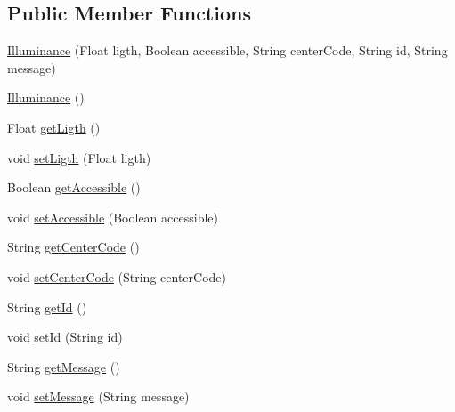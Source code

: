 \subsection*{Public Member Functions}
\begin{DoxyCompactItemize}
\item 
\mbox{\hyperlink{classcom_1_1osoc_1_1oncera_1_1javabean_1_1_illuminance_aabc086ae6b2857287955b2c802b1be4e}{Illuminance}} (Float ligth, Boolean accessible, String center\+Code, String id, String message)
\item 
\mbox{\hyperlink{classcom_1_1osoc_1_1oncera_1_1javabean_1_1_illuminance_ac8449614cef0b7637643a05b2abec682}{Illuminance}} ()
\item 
Float \mbox{\hyperlink{classcom_1_1osoc_1_1oncera_1_1javabean_1_1_illuminance_acdcf32b75c2915cbf11a0d3040560d00}{get\+Ligth}} ()
\item 
void \mbox{\hyperlink{classcom_1_1osoc_1_1oncera_1_1javabean_1_1_illuminance_a06b837d139fc610a7f09a15227f4b013}{set\+Ligth}} (Float ligth)
\item 
Boolean \mbox{\hyperlink{classcom_1_1osoc_1_1oncera_1_1javabean_1_1_illuminance_ab83f3f7ccc3a861cbae6fbedb600244b}{get\+Accessible}} ()
\item 
void \mbox{\hyperlink{classcom_1_1osoc_1_1oncera_1_1javabean_1_1_illuminance_a7c98ea5a529f1727f99334c9061d41e2}{set\+Accessible}} (Boolean accessible)
\item 
String \mbox{\hyperlink{classcom_1_1osoc_1_1oncera_1_1javabean_1_1_illuminance_a16d05e58e00435b3bdb2ffaaba7ff895}{get\+Center\+Code}} ()
\item 
void \mbox{\hyperlink{classcom_1_1osoc_1_1oncera_1_1javabean_1_1_illuminance_a482f3e7911ab9aea5996ed2576519efe}{set\+Center\+Code}} (String center\+Code)
\item 
String \mbox{\hyperlink{classcom_1_1osoc_1_1oncera_1_1javabean_1_1_illuminance_a033d07e87dedbd0ffca7ead9c08e7cc1}{get\+Id}} ()
\item 
void \mbox{\hyperlink{classcom_1_1osoc_1_1oncera_1_1javabean_1_1_illuminance_a2f532376f0523de2ff0ae59a0b7bc615}{set\+Id}} (String id)
\item 
String \mbox{\hyperlink{classcom_1_1osoc_1_1oncera_1_1javabean_1_1_illuminance_a20485e968889fef8b8df3da548876dcf}{get\+Message}} ()
\item 
void \mbox{\hyperlink{classcom_1_1osoc_1_1oncera_1_1javabean_1_1_illuminance_a3d8e2d160316b85d1f4ecbbf21379e28}{set\+Message}} (String message)
\end{DoxyCompactItemize}


